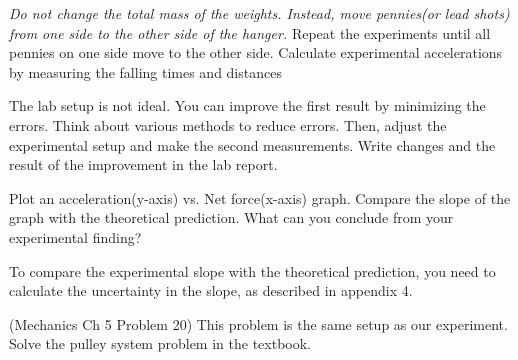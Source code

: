 
\textit{Do not change the total mass of the weights. Instead, move pennies(or lead shots) from one side to the other side of the hanger.} Repeat the experiments until all pennies on one side move to the other side. Calculate experimental accelerations by measuring the falling times and distances 


The lab setup is not ideal. You can improve the first result by minimizing the errors. Think about various methods to reduce errors. Then, adjust the experimental setup and make the second measurements. Write changes and the result of the improvement in the lab report. 


\analysis
Plot an acceleration(y-axis) vs. Net force(x-axis) graph. Compare the slope of the graph with the theoretical prediction. What can you conclude from your experimental finding? 

To compare the experimental slope with the theoretical prediction, you need to calculate the uncertainty in the slope,
as described in appendix 4.

\prelab

\prelabquestion (Mechanics Ch 5 Problem 20) This problem is the same setup as our experiment. Solve the pulley system problem in the textbook. 

